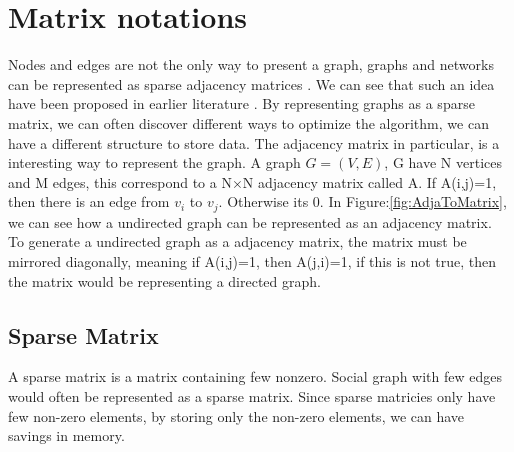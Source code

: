 \section{Matrix notations}
Nodes and edges are not the only way to present a graph, graphs and networks can be represented as sparse adjacency matrices \cite{AlgoToMath}. We can see that such an idea have been proposed in earlier literature \cite{McAndrew1963}. By representing graphs as a sparse matrix, we can often discover different ways to optimize the algorithm, we can have a different structure to store data. The adjacency matrix in particular, is a interesting way to represent the graph. A graph $G =(V,E)$, G have N vertices and M edges, this correspond to a N$\times$N adjacency matrix called A. If A(i,j)=1, then there is an edge from $v_i$ to $v_j$. Otherwise its 0. In Figure:\ref{fig:AdjaToMatrix}, we can see how a undirected graph can be represented as an adjacency matrix. To generate a undirected graph as a adjacency matrix, the matrix must be mirrored diagonally, meaning if A(i,j)=1, then A(j,i)=1, if this is not true, then the matrix would be representing a directed graph.

\subsection{Sparse Matrix}
A sparse matrix is a matrix containing few nonzero. Social graph with few edges would often be represented as a sparse matrix. Since sparse matricies only have few non-zero elements, by storing only the non-zero elements, we can have savings in memory.


